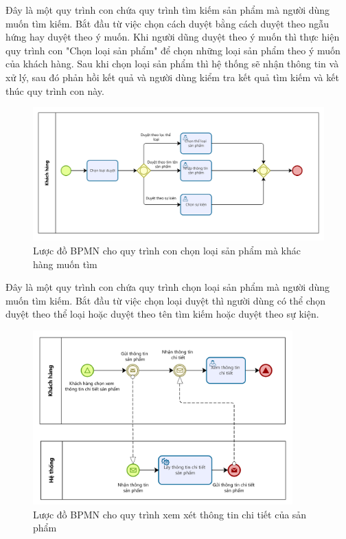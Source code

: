 Đây là một quy trình con chứa quy trình tìm kiếm sản phẩm mà người dùng muốn tìm kiếm. Bắt đầu từ việc chọn cách duyệt bằng cách duyệt theo ngẫu hứng hay duyệt theo ý muốn. Khi người dũng duyệt theo ý muốn thì thực hiện quy trình con "Chọn loại sản phẩm" để chọn những loại sản phẩm theo ý muốn của khách hàng. Sau khi chọn loại sản phẩm thì hệ thống sẽ nhận thông tin và xử lý, sau đó phản hồi kết quả và người dùng kiểm tra kết quả tìm kiếm và kết thúc quy trình con này.
 
\begin{figure}[!htp]
    \centering
    \includegraphics[width=12cm]{img/BPMN/customer_buy/customer_select_type.png}
    \newline
    \caption{Lược đồ BPMN cho quy trình con chọn loại sản phẩm mà khác hàng muốn tìm}
\end{figure}
 
Đây là một quy trình con chứa quy trình chọn loại sản phẩm mà người dùng muốn tìm kiếm. Bắt đầu từ việc chọn loại duyệt thì người dùng có thể chọn duyệt theo thể loại hoặc duyệt theo tên tìm kiếm hoặc duyệt theo sự kiện.
 
\newpage
 
\begin{figure}[!htp]
    \centering
    \includegraphics[width=10cm]{img/BPMN/customer_buy/customer_product_detail.png}
    \newline
    \caption{Lược đồ BPMN cho quy trình xem xét thông tin chi tiết của sản phẩm}
\end{figure}
 
